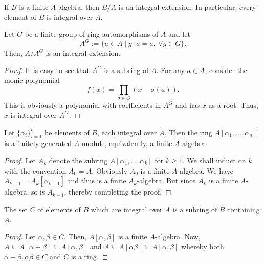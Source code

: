 \begin{corollary}
    If $B$ is a finite $A$-algebra, then $B/A$ is an integral extension. In particular, every element of $B$ is integral over $A$.
\end{corollary}

\begin{proposition}
    Let $G$ be a finite group of ring automorphisms of $A$ and let 
    \begin{equation*}
        A^G := \{a\in A\mid g\cdot a = a,~\forall g\in G\}.
    \end{equation*}
    Then, $A/A^G$ is an integral extension.
\end{proposition}
\begin{proof}
    It is easy to see that $A^G$ is a subring of $A$. For any $a\in A$, consider the monic polynomial 
    \begin{equation*}
        f(x) = \prod_{\sigma\in G}(x - \sigma(a)).
    \end{equation*}
    This is obviously a polynomial with coefficients in $A^G$ and has $x$ as a root. Thus, $x$ is integral over $A^G$.
\end{proof}

\begin{proposition}
    Let $\{\alpha_i\}_{i = 1}^n$ be elements of $B$, each integral over $A$. Then the ring $A[\alpha_1,\ldots,\alpha_n]$ is a finitely generated $A$-module, equivalently, a finite $A$-algebra.
\end{proposition}
\begin{proof}
    Let $A_k$ denote the subring $A[\alpha_1,\dots,\alpha_k]$ for $k\ge 1$. We shall induct on $k$ with the convention $A_0 = A$. Obviously $A_0$ is a finite $A$-algebra. We have $A_{k + 1} = A_k[\alpha_{k + 1}]$ and thus is a finite $A_k$-algebra. But since $A_k$ is a finite $A$-algebra, so is $A_{k + 1}$, thereby completing the proof.
\end{proof}

\begin{corollary}
    The set $C$ of elements of $B$ which are integral over $A$ is a subring of $B$ containing $A$.
\end{corollary}
\begin{proof}
    Let $\alpha,\beta\in C$. Then, $A[\alpha,\beta]$ is a finite $A$-algebra. Now, $A\subseteq A[\alpha - \beta]\subseteq A[\alpha,\beta]$ and $A\subseteq A[\alpha\beta]\subseteq A[\alpha,\beta]$ whereby both $\alpha - \beta,\alpha\beta\in C$ and $C$ is a ring.
\end{proof}

